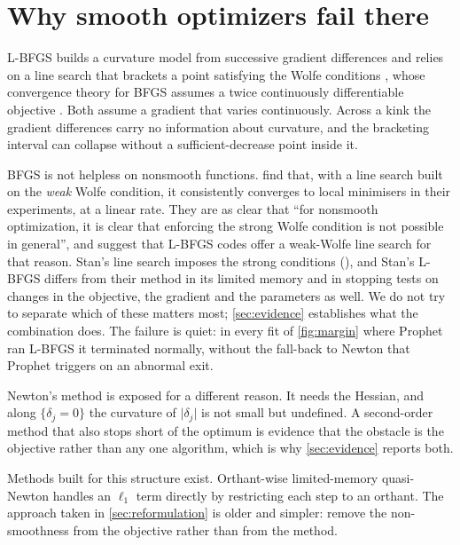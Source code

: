 \section{Why smooth optimizers fail there}
\label{sec:smooth}

L-BFGS builds a curvature model from successive gradient differences and relies on
a line search that brackets a point satisfying the Wolfe conditions
\citep{nocedal2006numerical}, whose convergence theory for BFGS assumes a twice
continuously differentiable objective \citep[Assumption~6.1]{nocedal2006numerical}.
Both assume a gradient that varies continuously. Across a kink the gradient
differences carry no information about curvature, and the bracketing interval can
collapse without a sufficient-decrease point inside it.

BFGS is not helpless on nonsmooth functions. \citet{lewis2013nonsmooth} find that,
with a line search built on the \emph{weak} Wolfe condition, it consistently
converges to local minimisers in their experiments, at a linear rate. They are as
clear that ``for nonsmooth optimization, it is clear that enforcing the strong Wolfe
condition is not possible in general'', and suggest that L-BFGS codes offer a
weak-Wolfe line search for that reason. Stan's line search imposes the strong
conditions (), and Stan's L-BFGS differs
from their method in its limited memory and in stopping tests on changes in the
objective, the gradient and the parameters as well. We do not try to separate
which of these matters most; \cref{sec:evidence} establishes what the combination
does. The failure is quiet: in every fit of \cref{fig:margin} where Prophet ran
L-BFGS it terminated normally, without the fall-back to Newton that Prophet
triggers on an abnormal exit.

Newton's method is exposed for a different reason. It needs the Hessian, and
along $\{\delta_j = 0\}$ the curvature of $\lvert\delta_j\rvert$ is not small but
undefined. A second-order method that also stops short of the optimum is evidence
that the obstacle is the objective rather than any one algorithm, which is why
\cref{sec:evidence} reports both.

Methods built for this structure exist. Orthant-wise limited-memory quasi-Newton
\citep[OWL-QN;][]{andrew2007scalable} handles an $\ell_1$ term directly by
restricting each step to an orthant. The approach taken in \cref{sec:reformulation}
is older and simpler: remove the non-smoothness from the objective rather than
from the method.
